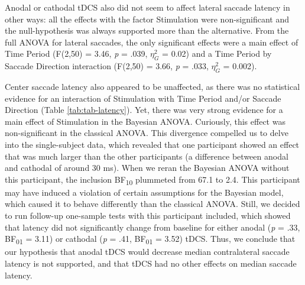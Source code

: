 \documentclass[11pt,english,]{memoir}
\begin{document}
Anodal or cathodal tDCS also did not seem to affect lateral saccade latency in other ways: all the effects with the factor Stimulation were non-significant and the null-hypothesis was always supported more than the alternative. From the full ANOVA for lateral saccades, the only significant effects were a main effect of Time Period (F(2,50) = 3.46, \emph{p} = .039, \(\eta_{G}^{2}\) = 0.02) and a Time Period by Saccade Direction interaction (F(2,50) = 3.66, \emph{p} = .033, \(\eta_{G}^{2}\) = 0.002).

Center saccade latency also appeared to be unaffected, as there was no statistical evidence for an interaction of Stimulation with Time Period and/or Saccade Direction (Table \ref{tab:tab-latency}). Yet, there was very strong evidence for a main effect of Stimulation in the Bayesian ANOVA. Curiously, this effect was non-significant in the classical ANOVA. This divergence compelled us to delve into the single-subject data, which revealed that one participant showed an effect that was much larger than the other participants (a difference between anodal and cathodal of around 30 ms). When we reran the Bayesian ANOVA without this participant, the inclusion BF\textsubscript{10} plummeted from 67.1 to 2.4. This participant may have induced a violation of certain assumptions for the Bayesian model, which caused it to behave differently than the classical ANOVA. Still, we decided to run follow-up one-sample tests with this participant included, which showed that latency did not significantly change from baseline for either anodal (\emph{p} = .33, BF\textsubscript{01} = 3.11) or cathodal (\emph{p} = .41, BF\textsubscript{01} = 3.52) tDCS. Thus, we conclude that our hypothesis that anodal tDCS would decrease median contralateral saccade latency is not supported, and that tDCS had no other effects on median saccade latency.
\end{document}
